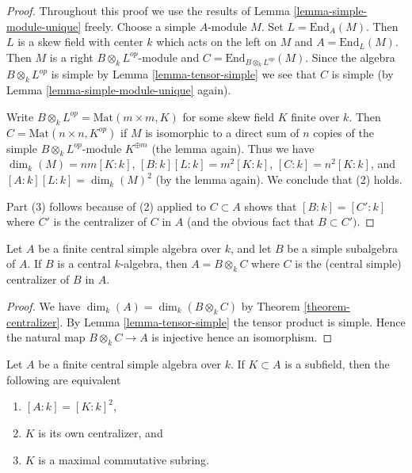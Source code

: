 \begin{proof}
Throughout this proof we use the results of
Lemma \ref{lemma-simple-module-unique} freely.
Choose a simple $A$-module $M$. Set $L = \text{End}_A(M)$.
Then $L$ is a skew field with center $k$ which acts on the left on $M$
and $A = \text{End}_L(M)$.
Then $M$ is a right $B \otimes_k L^{op}$-module and
$C = \text{End}_{B \otimes_k L^{op}}(M)$.
Since the algebra $B \otimes_k L^{op}$ is simple by
Lemma \ref{lemma-tensor-simple} we see that $C$ is simple (by
Lemma \ref{lemma-simple-module-unique} again).

\medskip\noindent
Write $B \otimes_k L^{op} = \text{Mat}(m \times m, K)$ for some
skew field $K$ finite over $k$. Then $C = \text{Mat}(n \times n, K^{op})$
if $M$ is isomorphic to a direct sum of $n$ copies of the simple
$B \otimes_k L^{op}$-module $K^{\oplus m}$ (the lemma again). Thus we have
$\dim_k(M) = nm [K : k]$, $[B : k] [L : k] = m^2 [K : k]$,
$[C : k] = n^2 [K : k]$, and $[A : k] [L : k] = \dim_k(M)^2$ (by
the lemma again). We conclude that (2) holds.

\medskip\noindent
Part (3) follows because of (2) applied to $C \subset A$ shows
that $[B : k] = [C' : k]$ where $C'$ is the centralizer of $C$ in $A$
(and the obvious fact that $B \subset C')$.
\end{proof}

\begin{lemma}
\label{lemma-when-tensor-is-equal}
Let $A$ be a finite central simple algebra over $k$, and let
$B$ be a simple subalgebra of $A$. If $B$ is a central
$k$-algebra, then $A = B \otimes_k C$ where $C$ is the (central simple)
centralizer of $B$ in $A$.
\end{lemma}

\begin{proof}
We have $\dim_k(A) = \dim_k(B \otimes_k C)$ by
Theorem \ref{theorem-centralizer}. By
Lemma \ref{lemma-tensor-simple}
the tensor product is simple. Hence the natural map
$B \otimes_k C \to A$ is injective hence an isomorphism.
\end{proof}

\begin{lemma}
\label{lemma-self-centralizing-subfield}
Let $A$ be a finite central simple algebra over $k$.
If $K \subset A$ is a subfield, then the following are equivalent
\begin{enumerate}
\item $[A : k] = [K : k]^2$,
\item $K$ is its own centralizer, and
\item $K$ is a maximal commutative subring.
\end{enumerate}
\end{lemma}

